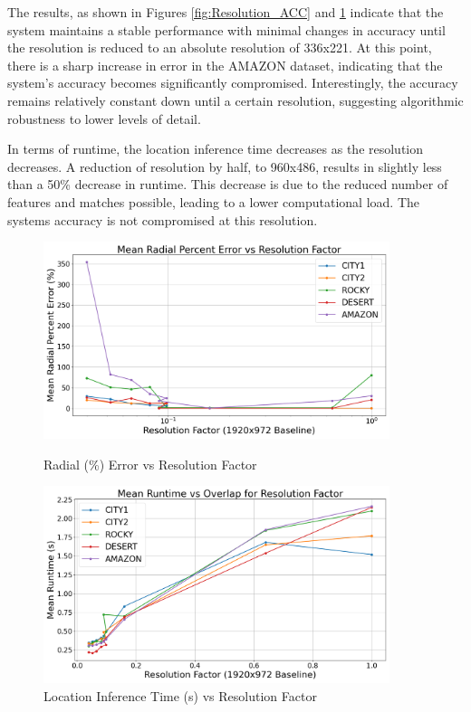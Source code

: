 The results, as shown in Figures \ref{fig:Resolution_ACC} and \ref{fig:Resolution_Time} indicate that the system maintains a stable performance with minimal changes in accuracy until the resolution is reduced to an absolute resolution of 336x221. At this point, there is a sharp increase in error in the AMAZON dataset, indicating that the system's accuracy becomes significantly compromised. Interestingly, the accuracy remains relatively constant down until a certain resolution, suggesting algorithmic robustness to lower levels of detail. 

In terms of runtime, the location inference time decreases as the resolution decreases. A reduction of resolution by half, to 960x486, results in slightly less than a 50\% decrease in runtime. This decrease is due to the reduced number of features and matches possible, leading to a lower computational load. The systems accuracy is not compromised at this resolution. 

\begin{figure}[H]
    \centering
    \begin{minipage}{0.48\textwidth}
        \centering
        \includegraphics[width=0.9\textwidth]{Chapter 5/RESULTPLOTS/lowres/lowresacc.png}
        \caption{Radial (\%) Error vs Resolution Factor}
        \label{fig:Resolution_ACC}
    \end{minipage}\hfill
    \begin{minipage}{0.48\textwidth}
        \centering
        \includegraphics[width=0.9\textwidth]{Chapter 5/RESULTPLOTS/lowres/lowrestime.png}
        \caption{Location Inference Time (s) vs Resolution Factor}
        \label{fig:Resolution_Time}
    \end{minipage}
\end{figure}


